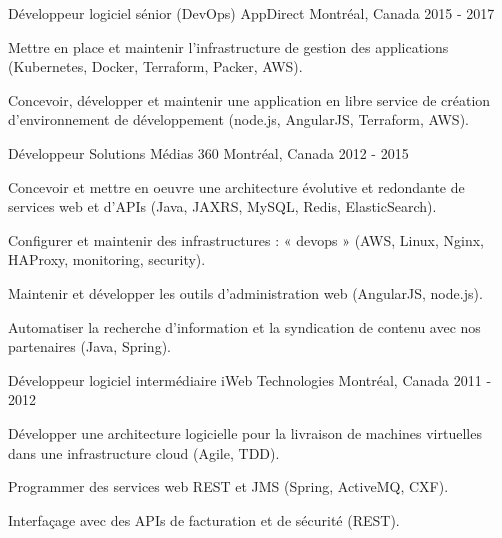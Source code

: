 \begin{cventries}
  \cventry
    {Développeur logiciel sénior (DevOps)} %
    {AppDirect} %
    {Montréal, Canada} %
    {2015 - 2017} %
    {
      \begin{cvitems} %
        \item {Mettre en place et maintenir l'infrastructure de gestion des applications (Kubernetes, Docker, Terraform, Packer, AWS).}
        \item {Concevoir, développer et maintenir une application en libre service de création d'environnement de développement (node.js, AngularJS, Terraform, AWS).}
      \end{cvitems}
    }

  \cventry
    {Développeur} %
    {Solutions Médias 360} %
    {Montréal, Canada} %
    {2012 - 2015} %
    {
      \begin{cvitems} %
        \item {Concevoir et mettre en oeuvre une architecture évolutive et redondante de services web et d’APIs (Java, JAXRS, MySQL, Redis, ElasticSearch).}
        \item {Configurer et maintenir des infrastructures : « devops » (AWS, Linux, Nginx, HAProxy, monitoring, security).}
        \item {Maintenir et développer les outils d’administration web (AngularJS, node.js).}
        \item {Automatiser la recherche d'information et la syndication de contenu avec nos partenaires (Java, Spring).}
      \end{cvitems}
    }

  \cventry
    {Développeur logiciel intermédiaire} %
    {iWeb Technologies} %
    {Montréal, Canada} %
    {2011 - 2012} %
    {
      \begin{cvitems} %
        \item {Développer une architecture logicielle pour la livraison de machines virtuelles dans une infrastructure cloud (Agile, TDD).}
        \item {Programmer des services web REST et JMS (Spring, ActiveMQ, CXF).}
        \item {Interfaçage avec des APIs de facturation et de sécurité (REST).}
      \end{cvitems}
    }


\end{cventries}
